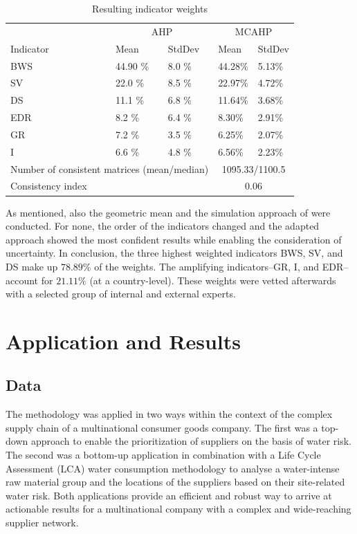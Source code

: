 \documentclass[a4paper]{article}
\begin{document}
\begin{table}[t b h]
\caption{Resulting indicator weights}
\centering
\begin{tabular} {p{4cm} l l l l} \\ 
\toprule
	 &	\multicolumn{2}{c}{AHP} & \multicolumn{2}{c}{MCAHP} \\
Indicator	& Mean 		& StdDev	& Mean		& StdDev\\
\midrule 	
BWS			& 44.90 \% 	& 8.0 \%	& 44.28\% 	& 5.13\% \\
SV			& 22.0 \% 	& 8.5 \% 	& 22.97\% 	& 4.72\%\\
DS			& 11.1 \% 	& 6.8 \% 	& 11.64\% 	& 3.68\%\\
EDR			& 8.2 \% 	& 6.4 \% 	& 8.30\%  	& 2.91\%\\	
GR 			& 7.2 \% 	& 3.5 \%	& 6.25\%  	& 2.07\%\\
I			& 6.6 \% 	& 4.8 \% 	& 6.56\%  	& 2.23\%\\
\multicolumn{3}{c}{Number of consistent matrices (mean/median)}&  \multicolumn{2}{c}{1095.33/1100.5}\\
Consistency index			&& 	& \multicolumn{2}{c}{0.06}\\
\bottomrule
\end{tabular}
\label{tab:results}
\end{table} 

As mentioned, also the geometric mean and the simulation approach of \citep{Ataei:2013} were conducted.
For none, the order of the indicators changed and the adapted approach showed the most confident results while enabling the consideration of uncertainty.
In conclusion, the three highest weighted indicators BWS, SV, and DS make up $78.89\%$ of the weights. 
The amplifying indicators--GR, I, and EDR--account for $21.11\%$  (at a country-level). 
These weights were vetted afterwards with a selected group of internal and external experts.

\section{Application and Results}
\subsection{Data}
The methodology was applied in two ways within the context of the complex supply chain of a multinational consumer goods company. 
The first was a top-down approach to enable the prioritization of suppliers on the basis of water risk. 
The second was a bottom-up application in combination with a Life Cycle Assessment (LCA) water consumption methodology to analyse a water-intense raw material group and the locations of the suppliers based on their site-related water risk. 
Both applications provide an efficient and robust way to arrive at actionable results for a multinational company with a complex and wide-reaching supplier network.
 
\end{document}
